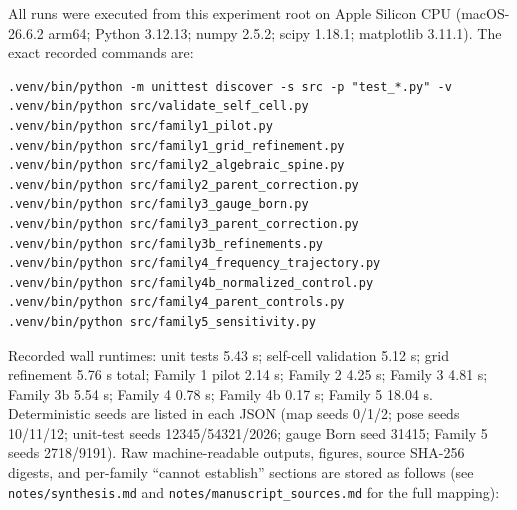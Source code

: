 \documentclass[12pt]{article}
\begin{document}
All runs were executed from this experiment root on Apple Silicon CPU
(macOS-26.6.2 arm64; Python 3.12.13; numpy 2.5.2; scipy 1.18.1; matplotlib
3.11.1). The exact recorded commands are:
\begin{verbatim}
.venv/bin/python -m unittest discover -s src -p "test_*.py" -v
.venv/bin/python src/validate_self_cell.py
.venv/bin/python src/family1_pilot.py
.venv/bin/python src/family1_grid_refinement.py
.venv/bin/python src/family2_algebraic_spine.py
.venv/bin/python src/family2_parent_correction.py
.venv/bin/python src/family3_gauge_born.py
.venv/bin/python src/family3_parent_correction.py
.venv/bin/python src/family3b_refinements.py
.venv/bin/python src/family4_frequency_trajectory.py
.venv/bin/python src/family4b_normalized_control.py
.venv/bin/python src/family4_parent_controls.py
.venv/bin/python src/family5_sensitivity.py
\end{verbatim}
Recorded wall runtimes: unit tests 5.43 s; self-cell validation 5.12 s;
grid refinement 5.76 s total; Family 1 pilot 2.14 s; Family 2 4.25 s; Family 3
4.81 s; Family 3b 5.54 s; Family 4 0.78 s; Family 4b 0.17 s; Family 5 18.04 s.
Deterministic seeds are listed in each JSON (map seeds 0/1/2; pose seeds
10/11/12; unit-test seeds 12345/54321/2026; gauge Born seed 31415; Family 5
seeds 2718/9191). Raw machine-readable outputs, figures, source SHA-256
digests, and per-family ``cannot establish'' sections are stored as follows
(see \texttt{notes/synthesis.md} and \texttt{notes/manuscript\_sources.md} for the full
mapping):
\end{document}

